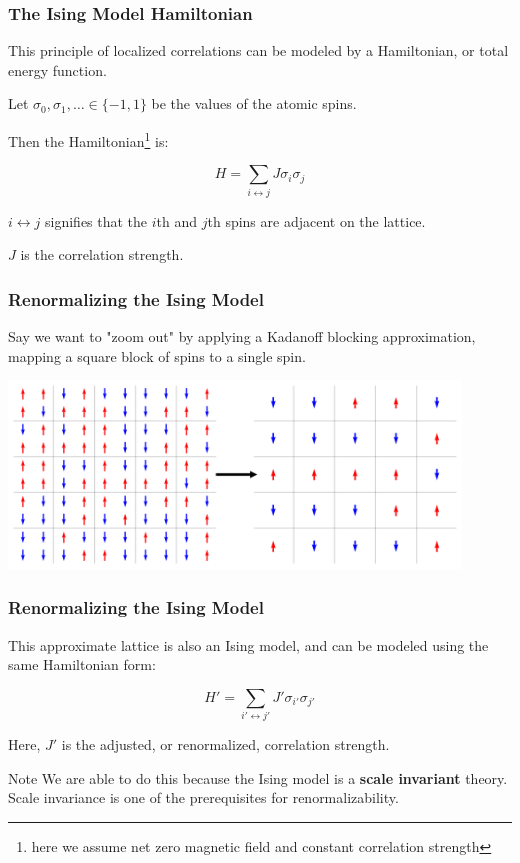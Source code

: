 \documentclass[aspectratio=169, 12pt]{beamer}
\begin{document}
\begin{frame}
    \frametitle{The Ising Model Hamiltonian}

    This principle of localized correlations can be modeled by a Hamiltonian, or total energy function. 

    \vspace{1em}

    Let $\sigma_0, \sigma_1, \dots \in \{-1, 1\}$ be the values of the atomic spins. 

    Then the Hamiltonian\footnote{here we assume net zero magnetic field and constant correlation strength} is:

    \[
    H = \sum_{i \leftrightarrow j} J \sigma_i \sigma_j
    \]

    $i \leftrightarrow j$ signifies that the $i$th and $j$th spins are adjacent on the lattice. 
    
    $J$ is the correlation strength. 

\end{frame}
    
\begin{frame}

    \frametitle{Renormalizing the Ising Model}

    Say we want to "zoom out" by applying a Kadanoff blocking approximation, mapping a square block of spins to a single spin. 
    \begin{center}
        \includegraphics[width=0.9\textwidth]{images/ising-blocking.png}
    \end{center}
    
\end{frame}

\begin{frame}
    \frametitle{Renormalizing the Ising Model}

    This approximate lattice is also an Ising model, and can be modeled using the same Hamiltonian form:

    \[
    H' = \sum_{i' \leftrightarrow j'} J' \sigma_{i'} \sigma_{j'}
    \]

    Here, $J'$ is the adjusted, or renormalized, correlation strength. 

    \begin{alertblock}{Note}
        We are able to do this because the Ising model is a \textbf{scale invariant} theory. 
        Scale invariance is one of the prerequisites for renormalizability. 
    \end{alertblock}
     
\end{frame}
\end{document}
